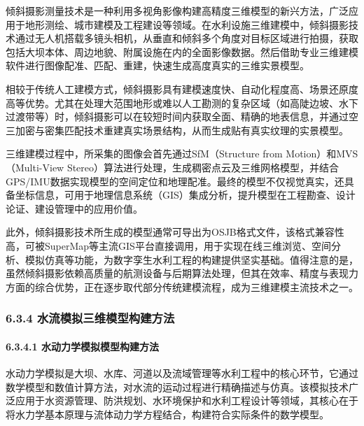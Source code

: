 倾斜摄影测量技术是一种利用多视角影像构建高精度三维模型的新兴方法，广泛应用于地形测绘、城市建模及工程建设等领域。在水利设施三维建模中，倾斜摄影技术通过无人机搭载多镜头相机，从垂直和倾斜多个角度对目标区域进行拍摄，获取包括大坝本体、周边地貌、附属设施在内的全面影像数据。然后借助专业三维建模软件进行图像配准、匹配、重建，快速生成高度真实的三维实景模型。

相较于传统人工建模方式，倾斜摄影具有建模速度快、自动化程度高、场景还原度高等优势。尤其在处理大范围地形或难以人工勘测的复杂区域（如高陡边坡、水下过渡带等）时，倾斜摄影可以在较短时间内获取全面、精确的地表信息，并通过空三加密与密集匹配技术重建真实场景结构，从而生成贴有真实纹理的实景模型。

三维建模过程中，所采集的图像会首先通过SfM（Structure from Motion）和MVS（Multi-View Stereo）算法进行处理，生成稠密点云及三维网格模型，并结合GPS/IMU数据实现模型的空间定位和地理配准。最终的模型不仅视觉真实，还具备坐标信息，可用于地理信息系统（GIS）集成分析，提升模型在工程勘查、设计论证、建设管理中的应用价值。

此外，倾斜摄影技术所生成的模型通常可导出为OSJB格式文件，该格式兼容性高，可被SuperMap等主流GIS平台直接调用，用于实现在线三维浏览、空间分析、模拟仿真等功能，为数字孪生水利工程的构建提供坚实基础。值得注意的是，虽然倾斜摄影依赖高质量的航测设备与后期算法处理，但其在效率、精度与表现力方面的综合优势，正在逐步取代部分传统建模流程，成为三维建模主流技术之一。

\hypertarget{ux6c34ux6d41ux6a21ux62dfux4e09ux7ef4ux6a21ux578bux6784ux5efaux65b9ux6cd5}{%
\subsubsection{6.3.4 水流模拟三维模型构建方法}\label{ux6c34ux6d41ux6a21ux62dfux4e09ux7ef4ux6a21ux578bux6784ux5efaux65b9ux6cd5}}

\hypertarget{ux6c34ux52a8ux529bux5b66ux6a21ux62dfux6a21ux578bux6784ux5efaux65b9ux6cd5}{%
\paragraph{6.3.4.1 水动力学模拟模型构建方法}\label{ux6c34ux52a8ux529bux5b66ux6a21ux62dfux6a21ux578bux6784ux5efaux65b9ux6cd5}}

水动力学模拟是大坝、水库、河道以及流域管理等水利工程中的核心环节，它通过数学模型和数值计算方法，对水流的运动过程进行精确描述与仿真。该模拟技术广泛应用于水资源管理、防洪规划、水环境保护和水利工程设计等领域，其核心在于将水力学基本原理与流体动力学方程结合，构建符合实际条件的数学模型。

